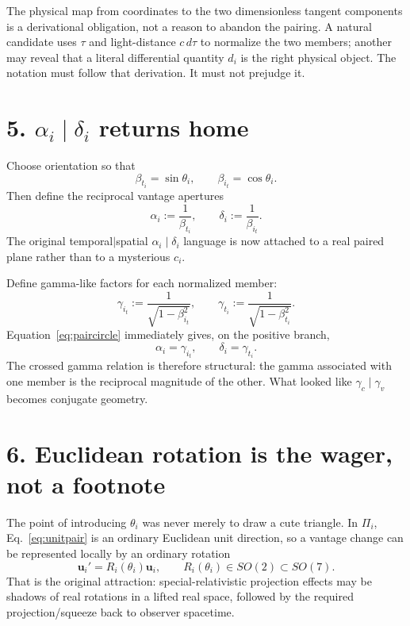 \documentclass[8pt,twocolumn]{extarticle}
\newcommand{\uvect}[1]{\mathbf u_{#1}}
\begin{document}
The physical map from coordinates to the two dimensionless tangent components
is a derivational obligation, not a reason to abandon the pairing. A natural
candidate uses $\tau$ and light-distance $c\,d\tau$ to normalize the two
members; another may reveal that a literal differential quantity $d_i$ is the
right physical object. The notation must follow that derivation. It must not
prejudge it.

\section*{5. $\alpha_i\mid\delta_i$ returns home}

Choose orientation so that
\begin{equation}
\beta_{t_i}=\sin\theta_i,
\qquad
\beta_{i_t}=\cos\theta_i.
\label{eq:pairangle}
\end{equation}
Then define the reciprocal vantage apertures
\begin{equation}
\alpha_i:=\frac1{\beta_{t_i}},
\qquad
\delta_i:=\frac1{\beta_{i_t}}.
\label{eq:pairaperture}
\end{equation}
The original temporal$\mid$spatial $\alpha_i\mid\delta_i$ language is now
attached to a real paired plane rather than to a mysterious $c_i$.

Define gamma-like factors for each normalized member:
\begin{equation}
\gamma_{i_t}:=\frac1{\sqrt{1-\beta_{i_t}^2}},
\qquad
\gamma_{t_i}:=\frac1{\sqrt{1-\beta_{t_i}^2}}.
\end{equation}
Equation~\eqref{eq:paircircle} immediately gives, on the positive branch,
\begin{equation}
\boxed{
\alpha_i=\gamma_{i_t},
\qquad
\delta_i=\gamma_{t_i}.
}
\label{eq:crossgamma}
\end{equation}
The crossed gamma relation is therefore structural: the gamma associated with
one member is the reciprocal magnitude of the other. What looked like
$\gamma_c\mid\gamma_v$ becomes conjugate geometry.

\section*{6. Euclidean rotation is the wager, not a footnote}

The point of introducing $\theta_i$ was never merely to draw a cute triangle.
In $\Pi_i$, Eq.~\eqref{eq:unitpair} is an ordinary Euclidean unit direction,
so a vantage change can be represented locally by an ordinary rotation
\begin{equation}
\uvect{i}'=R_i(\theta_i)\uvect{i},
\qquad
R_i(\theta_i)\in SO(2)\subset SO(7).
\label{eq:rotation}
\end{equation}
That is the original attraction: special-relativistic projection effects may
be shadows of real rotations in a lifted real space, followed by the required
projection/squeeze back to observer spacetime.
\end{document}
